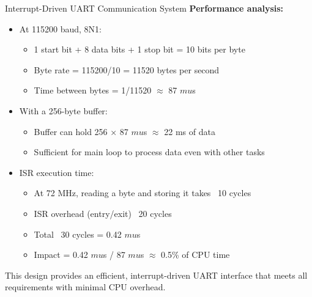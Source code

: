 \begin{example2}{Interrupt-Driven UART Communication System}
 \textbf{Performance analysis:}
   \begin{itemize}
     \item At 115200 baud, 8N1:
     \begin{itemize}
       \item 1 start bit + 8 data bits + 1 stop bit = 10 bits per byte
       \item Byte rate = 115200/10 = 11520 bytes per second
       \item Time between bytes = 1/11520 $\approx$ 87 $mu$s
     \end{itemize}
     \item With a 256-byte buffer:
     \begin{itemize}
       \item Buffer can hold 256 × 87 $mu$s $\approx$ 22 ms of data
       \item Sufficient for main loop to process data even with other tasks
     \end{itemize}
     \item ISR execution time:
     \begin{itemize}
       \item At 72 MHz, reading a byte and storing it takes ~10 cycles
       \item ISR overhead (entry/exit) ~20 cycles
       \item Total ~30 cycles = 0.42 $mu$s
       \item Impact = 0.42 $mu$s / 87 $mu$s $\approx$ 0.5\% of CPU time
     \end{itemize}
   \end{itemize}

This design provides an efficient, interrupt-driven UART interface that meets all requirements with minimal CPU overhead.

\end{example2}

